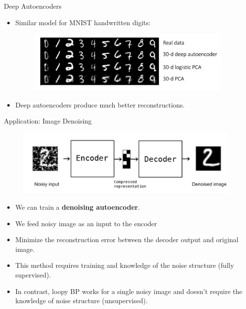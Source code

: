 \documentclass[handout,aspectratio=169]{beamer}
\begin{document}
\begin{frame}{Deep Autoencoders}
  \begin{itemize}
  \item Similar model for MNIST handwritten digits:
    \begin{figure}
      \centering
      \includegraphics[width=3.99in]{pics/auto-enc-mnist.png}
    \end{figure}
  \item Deep autoencoders produce much better reconstructions.
  \end{itemize}
\end{frame}

\begin{frame}{Application: Image Denoising}
  \begin{figure}
  \includegraphics[width=4.5in]{pics/mnist-denoise}
  \end{figure}
  \vspace{-5mm}  
  \begin{itemize}
  \item We can train a \textbf{denoising autoencoder}.
  
  \item We feed noisy image as an input to the encoder 
  \item Minimize the reconstruction error between the decoder output and original image.
\item This method requires training and knowledge of the noise structure (fully supervised).
  
  \item In contrast, loopy BP works for a single noisy image and doesn't require the knowledge of noise structure (unsupervised).
    \end{itemize}
\end{frame}
\end{document}
